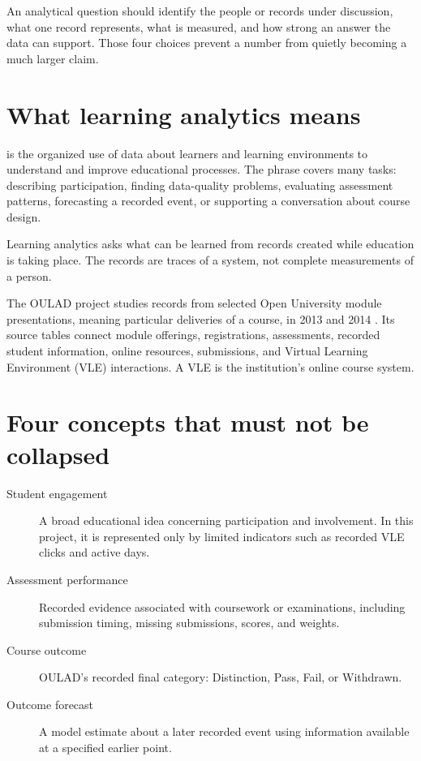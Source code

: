 \begin{plainlanguage}
An analytical question should identify the people or records under discussion,
what one record represents, what is measured, and how strong an answer the data
can support. Those four choices prevent a number from quietly becoming a much
larger claim.
\end{plainlanguage}

\section{What learning analytics means}

 is the organized use of data about learners and
learning environments to understand and improve educational processes. The
phrase covers many tasks: describing participation, finding data-quality
problems, evaluating assessment patterns, forecasting a recorded event, or
supporting a conversation about course design.

\begin{plainlanguage}
Learning analytics asks what can be learned from records created while
education is taking place. The records are traces of a system, not complete
measurements of a person.
\end{plainlanguage}

The OULAD project studies records from selected Open University module
presentations, meaning particular deliveries of a course, in 2013 and 2014
\citep{oulad_dataset,oulad_paper}. Its source
tables connect module offerings, registrations, assessments, recorded student
information, online resources, submissions, and Virtual Learning Environment
(VLE) interactions. A VLE is the institution's online course system.

\section{Four concepts that must not be collapsed}

\begin{description}
  \item[Student engagement] A broad educational idea concerning participation
    and involvement. In this project, it is represented only by limited
    indicators such as recorded VLE clicks and active days.
  \item[Assessment performance] Recorded evidence associated with coursework or
    examinations, including submission timing, missing submissions, scores, and
    weights.
  \item[Course outcome] OULAD's recorded final category: Distinction, Pass, Fail,
    or Withdrawn.
  \item[Outcome forecast] A model estimate about a later recorded event using
    information available at a specified earlier point.
\end{description}

